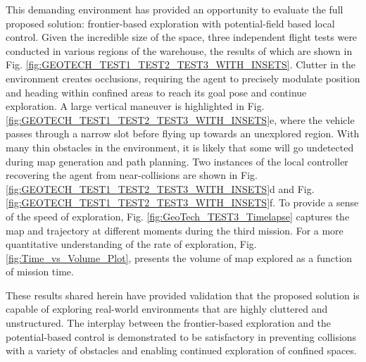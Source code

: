 \documentclass[letterpaper, 10 pt, conference]{ieeeconf}  %
\begin{document}
This demanding environment has provided an opportunity to evaluate the full proposed solution: frontier-based exploration with potential-field based local control. Given the incredible size of the space, three independent flight tests were conducted in various regions of the warehouse, the results of which are shown in Fig. \ref{fig:GEOTECH_TEST1_TEST2_TEST3_WITH_INSETS}. Clutter in the environment creates occlusions, requiring the agent to precisely modulate position and heading within confined areas to reach its goal pose and continue exploration. A large vertical maneuver is highlighted in Fig. \ref{fig:GEOTECH_TEST1_TEST2_TEST3_WITH_INSETS}e, where the vehicle passes through a narrow slot before flying up towards an unexplored region. With many thin obstacles in the environment, it is likely that some will go undetected during map generation and path planning. Two instances of the local controller recovering the agent from near-collisions are shown in Fig. \ref{fig:GEOTECH_TEST1_TEST2_TEST3_WITH_INSETS}d and Fig. \ref{fig:GEOTECH_TEST1_TEST2_TEST3_WITH_INSETS}f. To provide a sense of the speed of exploration, Fig. \ref{fig:GeoTech_TEST3_Timelapse} captures the map and trajectory at different moments during the third mission. For a more quantitative understanding of the rate of exploration, Fig. \ref{fig:Time_vs_Volume_Plot}, presents the volume of map explored as a function of mission time. \par

These results shared herein have provided validation that the proposed solution is capable of exploring real-world environments that are highly cluttered and unstructured. The interplay between the frontier-based exploration and the potential-based control is demonstrated to be satisfactory in preventing collisions with a variety of obstacles and enabling continued exploration of confined spaces.
\end{document}
